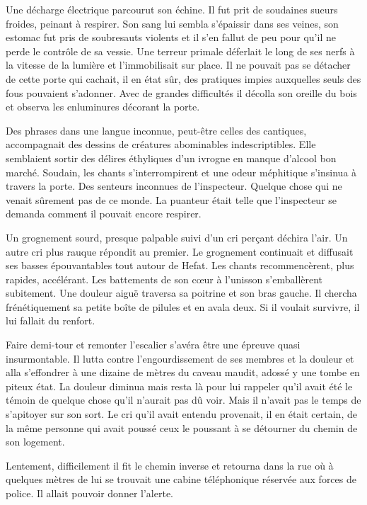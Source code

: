 \documentclass[12pt,a4paper,oneside]{memoir}
\begin{document}
Une décharge électrique parcourut son échine. Il fut prit de soudaines sueurs froides, peinant à respirer. Son sang 
lui sembla s'épaissir dans ses veines, son estomac fut pris de soubresauts violents et il s'en fallut de peu pour qu'il 
ne perde le contrôle de sa vessie. Une terreur primale déferlait le long de ses nerfs à la vitesse de la lumière et 
l'immobilisait sur place. Il ne pouvait pas se détacher de cette porte qui cachait, il en état sûr, des pratiques 
impies 
auxquelles seuls des fous pouvaient s'adonner. Avec de grandes difficultés il décolla son oreille du bois et observa 
les 
enluminures décorant la porte.

Des phrases dans une langue inconnue, peut-être celles des cantiques, accompagnait des dessins de créatures abominables 
indescriptibles. Elle semblaient sortir des délires éthyliques d'un ivrogne en manque d'alcool bon marché. Soudain, les 
chants s'interrompirent et une odeur méphitique s'insinua à travers la porte. Des senteurs inconnues de l'inspecteur. 
Quelque chose qui ne venait sûrement pas de ce monde. La puanteur était telle que l'inspecteur se demanda comment il 
pouvait encore respirer.

Un grognement sourd, presque palpable suivi d'un cri perçant déchira l'air. Un autre cri plus rauque répondit au 
premier. Le grognement continuait et diffusait ses basses épouvantables tout autour de Hefat. Les chants 
recommencèrent, plus rapides, accélérant. Les battements de son cœur à l'unisson s'emballèrent subitement. Une douleur 
aiguë traversa sa poitrine et son bras gauche. Il chercha frénétiquement sa petite boîte de pilules et en avala deux. 
Si 
il voulait survivre, il lui fallait du renfort.

Faire demi-tour et remonter l'escalier s'avéra être une épreuve quasi insurmontable. Il lutta contre l'engourdissement 
de ses membres et la douleur et alla s'effondrer à une dizaine de mètres du caveau maudit, adossé y une tombe en piteux 
état. La douleur diminua mais resta là pour lui rappeler qu'il avait été le témoin de quelque chose qu'il n'aurait pas 
dû voir. Mais il n'avait pas le temps de s'apitoyer sur son sort. Le cri qu'il avait entendu provenait, il en était 
certain, de la même personne qui avait poussé ceux le poussant à se détourner du chemin de son logement.

Lentement, difficilement il fit le chemin inverse et retourna dans la rue où à quelques mètres de lui se trouvait une 
cabine téléphonique réservée aux forces de police. Il allait pouvoir donner l'alerte.
\end{document}
